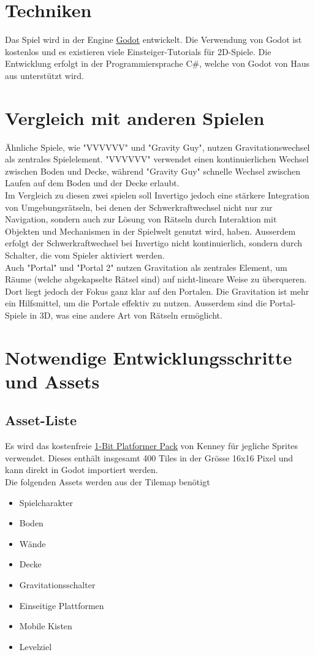 \documentclass{article}
\begin{document}
\section{Techniken}
Das Spiel wird in der Engine \hyperlink{https://godotengine.org/}{Godot} entwickelt. Die Verwendung von Godot ist kostenlos und es existieren viele Einsteiger-Tutorials für 2D-Spiele.
Die Entwicklung erfolgt in der Programmiersprache C\#, welche von Godot von Haus aus unterstützt wird.

\section{Vergleich mit anderen Spielen}

Ähnliche Spiele, wie "VVVVVV" und "Gravity Guy", nutzen Gravitationswechsel als zentrales Spielelement.
"VVVVVV" verwendet einen kontinuierlichen Wechsel zwischen Boden und Decke, während "Gravity Guy" schnelle Wechsel zwischen Laufen auf dem Boden und der Decke erlaubt.
\\
Im Vergleich zu diesen zwei spielen soll Invertigo jedoch eine stärkere Integration von Umgebungsrätseln, bei denen der Schwerkraftwechsel nicht nur zur Navigation,
sondern auch zur Lösung von Rätseln durch Interaktion mit Objekten und Mechanismen in der Spielwelt genutzt wird, haben.
Ausserdem erfolgt der Schwerkraftwechsel bei Invertigo nicht kontinuierlich, sondern durch Schalter, die vom Spieler aktiviert werden.
\\
Auch "Portal" und "Portal 2" nutzen Gravitation als zentrales Element, um Räume (welche abgekapselte Rätsel sind) auf nicht-lineare Weise zu überqueren.
Dort liegt jedoch der Fokus ganz klar auf den Portalen. Die Gravitation ist mehr ein Hilfsmittel, um die Portale effektiv zu nutzen.
Ausserdem sind die Portal-Spiele in 3D, was eine andere Art von Rätseln ermöglicht.

\section{Notwendige Entwicklungsschritte und Assets}
\subsection{Asset-Liste}
Es wird das kostenfreie \hyperlink{https://kenney.nl/assets/1-bit-platformer-pack}{1-Bit Platformer Pack} von Kenney für jegliche Sprites verwendet.
Dieses enthält insgesamt 400 Tiles in der Grösse 16x16 Pixel und kann direkt in Godot importiert werden.
\\
Die folgenden Assets werden aus der Tilemap benötigt
\begin{itemize}
    \item Spielcharakter
    \item Boden
    \item Wände
    \item Decke
    \item Gravitationsschalter
    \item Einseitige Plattformen
    \item Mobile Kisten
    \item Levelziel
\end{itemize}
\end{document}
